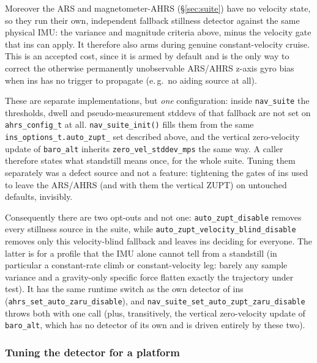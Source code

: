 \documentclass[11pt,a4paper]{article}
\newcommand{\code}[1]{\texttt{#1}}
\begin{document}
Moreover the ARS and magnetometer-AHRS (\S\ref{sec:suite}) have no velocity
state, so they run their own, independent fallback stillness detector
against the same physical IMU: the variance and magnitude criteria
above, minus the velocity gate that ins can apply. It therefore also arms
during genuine constant-velocity cruise. This is an accepted cost, since it
is armed by default and is the only way to correct the otherwise
permanently unobservable ARS/AHRS z-axis gyro bias when ins has no
trigger to propagate (e.\,g.\ no aiding source at all).

These are separate implementations, but \emph{one} configuration: inside
\code{nav\_\allowbreak{}suite} the thresholds, dwell and pseudo-measurement stddevs
of that fallback are not set on \code{ahrs\_\allowbreak{}config\_\allowbreak{}t} at all.
\code{nav\_\allowbreak{}suite\_\allowbreak{}init()} fills them from the same
\code{ins\_\allowbreak{}options\_\allowbreak{}t.auto\_\allowbreak{}zupt\_\allowbreak*} set described above, and
the vertical zero-velocity update of \code{baro\_\allowbreak{}alt} inherits
\code{zero\_\allowbreak{}vel\_\allowbreak{}stddev\_\allowbreak{}mps} the same way. A caller therefore states
what standstill means once, for the whole suite. Tuning them
separately was a defect source and not a feature: tightening the gates of ins
used to leave the ARS/AHRS (and with them the vertical ZUPT)
on untouched defaults, invisibly.

Consequently there are two opt-outs and not one:
\code{auto\_\allowbreak{}zupt\_\allowbreak{}disable} removes every stillness source in the suite,
while \code{auto\_\allowbreak{}zupt\_\allowbreak{}velocity\_\allowbreak{}blind\_\allowbreak{}disable} removes only this
velocity-blind fallback and leaves ins deciding for everyone. The
latter is for a profile that the IMU alone cannot tell from a standstill (in
particular a constant-rate climb or constant-velocity leg: barely any
sample variance and a gravity-only specific force
flatten exactly the trajectory under test). It has the same runtime switch as
the own detector of ins
(\code{ahrs\_\allowbreak{}set\_\allowbreak{}auto\_\allowbreak{}zaru\_\allowbreak{}disable}), and
\code{nav\_\allowbreak{}suite\_\allowbreak{}set\_\allowbreak{}auto\_\allowbreak{}zupt\_\allowbreak{}zaru\_\allowbreak{}disable} throws both with
one call (plus, transitively, the vertical zero-velocity update of
\code{baro\_\allowbreak{}alt}, which has no detector of its own and is driven
entirely by these two).

\subsubsection{Tuning the detector for a platform}
\label{sec:autozupt-tuning}
\end{document}
